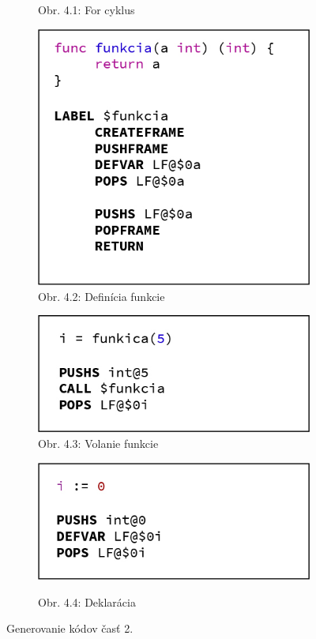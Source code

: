 \documentclass[a4paper,11pt]{article}
\begin{document}
\begin{figure}[h!]
\begin{subfigure}[h]{0.4\textwidth}
					\caption*{Obr. 4.1: For cyklus}
					\label{fig:for}
				\end{subfigure}\qquad
				\begin{subfigure}[h]{0.4\textwidth}
	    			\centering
	    			\includegraphics[width=\textwidth]{codes/func.jpg}\\
					\caption*{Obr. 4.2: Definícia funkcie}
					\label{fig:funcdef}
					\vspace{1cm}
	    			\includegraphics[width=\textwidth]{codes/func_call.jpg}\\
					\caption*{Obr. 4.3: Volanie funkcie}
					\label{fig:funccall}
					\vspace{1cm}
					\includegraphics[width=\textwidth]{codes/declaration.jpg}\\
					\caption*{Obr. 4.4: Deklarácia}
					\label{fig:deklaracia}
				\end{subfigure}
				\caption{Generovanie kódov časť 2.}
				\label{fig:4}
			\end{figure}
\end{document}
